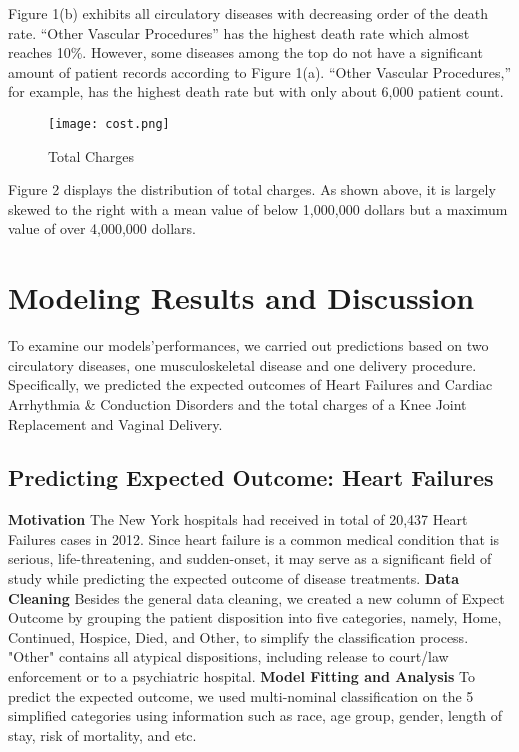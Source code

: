 \documentclass[12pt]{article}
\begin{document}
\noindent Figure 1(b) exhibits all circulatory diseases with decreasing order of the death rate. “Other Vascular Procedures” has the highest death rate which almost reaches 10\%. However, some diseases among the top do not have a significant amount of patient records according to Figure 1(a). “Other Vascular Procedures,” for example, has the highest death rate but with only about 6,000 patient count.

\begin{figure}[H]
\texttt{[image: cost.png]}
\caption{Total Charges}
\end{figure}

\noindent Figure 2 displays the distribution of total charges. As shown above, it is largely skewed to the right with a mean value of below 1,000,000 dollars but a maximum value of over 4,000,000 dollars. 

\section{Modeling Results and Discussion}

To examine our models'performances, we carried out predictions based on two circulatory diseases, one musculoskeletal disease and one delivery procedure. Specifically, we predicted the expected outcomes of Heart Failures and Cardiac Arrhythmia \& Conduction Disorders and the total charges of a Knee Joint Replacement and Vaginal Delivery.

\subsection{Predicting Expected Outcome: Heart Failures}

\textbf{Motivation} The New York hospitals had received in total of 20,437 Heart Failures cases in 2012. Since heart failure is a common medical condition that is serious, life-threatening, and sudden-onset, it may serve as a significant field of study while predicting the expected outcome of disease treatments. \bigskip
\newline \textbf{Data Cleaning} Besides the general data cleaning, we created a new column of Expect Outcome by grouping the patient disposition into five categories, namely, Home, Continued, Hospice, Died, and Other, to simplify the classification process. "Other" contains all atypical dispositions, including release to court/law enforcement or to a psychiatric hospital. \bigskip
\newline \textbf{Model Fitting and Analysis} To predict the expected outcome, we used multi-nominal classification on the 5 simplified categories using information such as race, age group, gender, length of stay, risk of mortality, and etc. \bigskip
\end{document}

